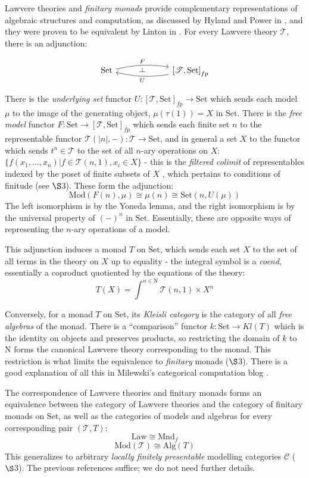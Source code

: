 \documentclass[a4paper,UKenglish]{article}
\theoremstyle{definition}
\def\ld{\rotatebox[origin=c]{-90}{$\dashv$}} %
\newcommand{\Set}{\mathrm{Set}}
\newcommand{\Alg}{\mathrm{Alg}}
\newcommand{\Mod}{\mathrm{Mod}}
\newcommand{\NN}{\mathrm{N}}
\newcommand{\C}{\mathscr{C}}
\newcommand{\T}{\mathscr{T}}
\begin{document}
Lawvere theories and \textit{finitary monads} provide complementary representations of algebraic structures and computation, as discussed by Hyland and Power in \cite{ltam}, and they were proven to be equivalent by Linton in \cite{linton}. For every Lawvere theory $\T$, there is an adjunction:

\[\begin{tikzcd}
	\Set \arrow[bend left=10,below]{rr}{F}
	& \ld &
	\arrow[bend left=10,above]{ll}{U} \left[\T,\Set\right]_{fp}
\end{tikzcd}\]

There is the \textit{underlying set} functor $U:[\T,\Set]_{fp} \to \Set$ which sends each model $\mu$ to the image of the generating object, $\mu(\tau(1)) = X$ in $\Set$. There is the \textit{free model} functor $F:\Set \to [\T,\Set]_{fp}$ which sends each finite set $n$ to the representable functor $\T(|n|,-):\T \to \Set$, and in general a set $X$ to the functor which sends $t^n \in \T$ to the set of all $n$-ary operations on $X$: $\{f(x_1,...,x_n)|f\in \T(n,1), x_i\in X\}$ - this is the \textit{filtered colimit} of representables indexed by the poset of finite subsets of $X$ \cite{nlab}, which pertains to conditions of finitude (see $\S$3). These form the adjunction: $$\Mod(F(n),\mu) \cong \mu(n) \cong \Set(n,U(\mu))$$ The left isomorphism is by the Yoneda lemma, and the right isomorphism is by the universal property of $(-)^n$ in $\Set$. Essentially, these are opposite ways of representing the $n$-ary operations of a model.

This adjunction induces a monad $T$ on $\Set$, which sends each set $X$ to the set of all terms in the theory on $X$ up to equality - the integral symbol is a \textit{coend}, essentially a coproduct quotiented by the equations of the theory: $$T(X) = \int^{n\in \NN} \T(n,1) \times X^n$$

Conversely, for a monad $T$ on $\Set$, its \textit{Kleisli category} is the category of all \textit{free algebras} of the monad. There is a ``comparison'' functor $k: \Set \to Kl(T)$ which is the identity on objects and preserves products, so restricting the domain of $k$ to $\NN$ forms the canonical Lawvere theory corresponding to the monad. This restriction is what limits the equivalence to \textit{finitary} monads ($\S$3). There is a good explanation of all this in Milewski's categorical computation blog \cite{milew}.

The correspondence of Lawvere theories and finitary monads forms an equivalence between the category of Lawvere theories and the category of finitary monads on $\Set$, as well as the categories of models and algebras for every corresponding pair $(\T, T)$: $$\mathrm{Law} \cong \mathrm{Mnd}_f$$ $$\Mod(\T) \cong \Alg(T)$$ This generalizes to arbitrary \textit{locally finitely presentable} modelling categories $\C$ ($\S$3). The previous references suffice; we do not need further details. 
\end{document}
